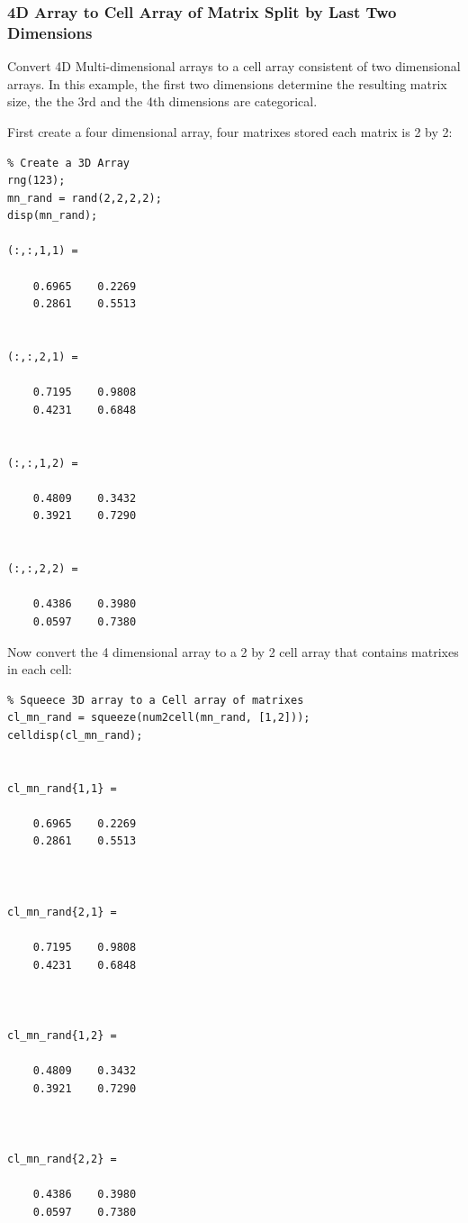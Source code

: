 \documentclass[
]{book}
\begin{document}
\hypertarget{d-array-to-cell-array-of-matrix-split-by-last-two-dimensions}{%
\subsubsection{4D Array to Cell Array of Matrix Split by Last Two Dimensions}\label{d-array-to-cell-array-of-matrix-split-by-last-two-dimensions}}

Convert 4D Multi-dimensional arrays to a cell array consistent of two
dimensional arrays. In this example, the first two dimensions determine
the resulting matrix size, the the 3rd and the 4th dimensions are
categorical.

First create a four dimensional array, four matrixes stored each matrix
is 2 by 2:

\begin{verbatim}
% Create a 3D Array
rng(123);
mn_rand = rand(2,2,2,2);
disp(mn_rand);

(:,:,1,1) =

    0.6965    0.2269
    0.2861    0.5513


(:,:,2,1) =

    0.7195    0.9808
    0.4231    0.6848


(:,:,1,2) =

    0.4809    0.3432
    0.3921    0.7290


(:,:,2,2) =

    0.4386    0.3980
    0.0597    0.7380
\end{verbatim}

Now convert the 4 dimensional array to a 2 by 2 cell array that contains
matrixes in each cell:

\begin{verbatim}
% Squeece 3D array to a Cell array of matrixes
cl_mn_rand = squeeze(num2cell(mn_rand, [1,2]));
celldisp(cl_mn_rand);


cl_mn_rand{1,1} =
 
    0.6965    0.2269
    0.2861    0.5513



cl_mn_rand{2,1} =
 
    0.7195    0.9808
    0.4231    0.6848



cl_mn_rand{1,2} =
 
    0.4809    0.3432
    0.3921    0.7290



cl_mn_rand{2,2} =
 
    0.4386    0.3980
    0.0597    0.7380
\end{verbatim}
\end{document}
